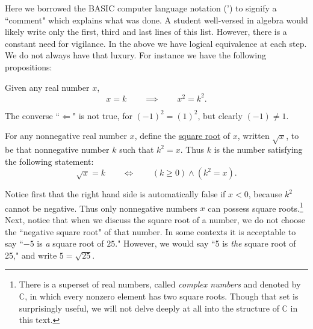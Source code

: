 \noindent
Here we borrowed the BASIC computer language notation (') to signify
a ``comment" which explains what was done.
A student well-versed in algebra would likely write only the
first, third and last lines of this list.  However, there is a
constant need for vigilance.  In the above we have logical
equivalence at each step.  We  do not always have that luxury.
For instance we have the following propositions:
\begin{principle} Given any real number $x$,
\begin{equation} x=k\qquad\implies\qquad x^2=k^2.\end{equation}
\end{principle} 
The converse ``$\Longleftarrow$" 
is not true, for $(-1)^2=(1)^2$, but clearly
$(-1)\ne1$.  
\begin{definition}For any nonnegative real number $x$, define
the \underline{square root} of $x$, written $\sqrt{x}$, to be that
nonnegative number $k$ such that $k^2=x$.  Thus $k$ is the number
satisfying the following statement:  
\begin{equation}
\sqrt{x}=k\qquad\iff\qquad(k\ge0)\wedge(k^2=x).
\end{equation}
\end{definition}
Notice first that the right hand side is automatically false if
$x<0$, because $k^2$ cannot be negative.  Thus only nonnegative
numbers $x$ can possess square roots.\footnote{There is
a superset of real numbers, called {\it complex numbers}
and denoted by $\mathbb{C}$, in which every nonzero element has
two square roots.  Though that set is surprisingly useful,
we will not delve deeply at all into the structure
of  $\mathbb{C}$
in this text.}
  Next, notice that
when we discuss the square root of a number, we do not choose
the ``negative square root" of that number.  In some contexts
it is acceptable to say ``$-5$ is {\em a} square root
of $25$."  However, we would say ``5 is {\em the}
square root of 25," and write $5=\sqrt{25}$.


